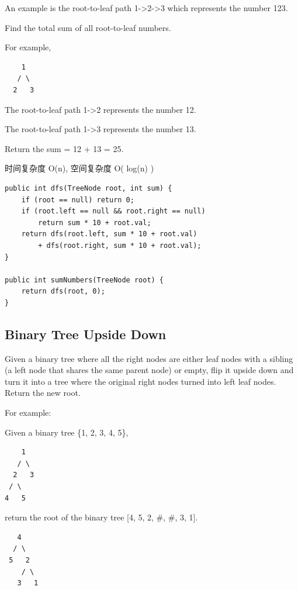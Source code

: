 \documentclass[12pt]{book}
\begin{document}
An example is the root-to-leaf path 1->2->3 which represents the number 123.

Find the total sum of all root-to-leaf numbers.

For example,
\lstset{language=java,label= ,caption= ,numbers=none}
\begin{lstlisting}
    1
   / \
  2   3
\end{lstlisting}

The root-to-leaf path 1->2 represents the number 12.

The root-to-leaf path 1->3 represents the number 13.

Return the sum = 12 + 13 = 25.

时间复杂度 O(n), 空间复杂度 O( log(n) )

\lstset{language=java,label= ,caption= ,numbers=none}
\begin{lstlisting}
public int dfs(TreeNode root, int sum) {
    if (root == null) return 0;
    if (root.left == null && root.right == null)
        return sum * 10 + root.val;
    return dfs(root.left, sum * 10 + root.val)
        + dfs(root.right, sum * 10 + root.val);
}
        
public int sumNumbers(TreeNode root) {
    return dfs(root, 0);
}
\end{lstlisting}

\subsection{Binary Tree Upside Down}
\label{sec-4-5-7}
Given a binary tree where all the right nodes are either leaf nodes with a sibling (a left node that shares the same parent node) or empty, flip it upside down and turn it into a tree where the original right nodes turned into left leaf nodes. Return the new root.

For example:

Given a binary tree \{1, 2, 3, 4, 5\},
\lstset{language=java,label= ,caption= ,numbers=none}
\begin{lstlisting}
    1
   / \
  2   3
 / \
4   5
\end{lstlisting}

return the root of the binary tree [4, 5, 2, \#, \#, 3, 1].
\lstset{language=java,label= ,caption= ,numbers=none}
\begin{lstlisting}
   4
  / \
 5   2
    / \
   3   1
\end{lstlisting}
\end{document}
